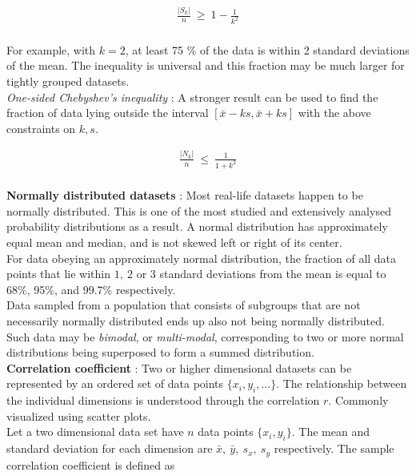 \begin{align}
	\frac{|S_{k}|}{n} \ \geq \ 1 - \frac{1}{k^{2}} 
\end{align}\\

For example, with $k = 2$, at least 75 \% of the data is within 2 standard deviations of the mean. The inequality is universal and this fraction may be much larger for tightly grouped datasets.\\

\textit{One-sided Chebyshev's inequality} : A stronger result can be used to find the fraction of data lying outside the interval  $ [ \bar{x} - ks, \bar{x} + ks ] $ with the above constraints on $ k, s $.

\begin{align}
	\frac{|N_{k}|}{n} \ \leq \ \frac{1}{1 + k^{2}} 
\end{align}\\

\textbf{Normally distributed datasets} : Most real-life datasets happen to be normally distributed. This is one of the most studied and extensively analysed probability distributions as a result. A normal distribution has approximately equal mean and median, and is not skewed left or right of its center.\\

For data obeying an approximately normal distribution, the fraction of all data points that lie within $ 1,\ 2 $ or $ 3 $ standard deviations from the mean is equal to 68\%, 95\%, and 99.7\% respectively. \\

Data sampled from a population that consists of subgroups that are not necessarily normally distributed ends up also not being normally distributed. Such data may be \textit{bimodal}, or \textit{multi-modal}, corresponding to two or more normal distributions being superposed to form a summed distribution. \\

\textbf{Correlation coefficient} : Two or higher dimensional datasets can be represented by an ordered set of data points $ \{x_i, y_i, ...\} $. The relationship between the individual dimensions is understood through the correlation $ r $. Commonly visualized using scatter plots. \\

Let a two dimensional data set have $ n $ data points $ \{x_i, y_i\} $. The mean and standard deviation for each dimension are $ \bar{x},\ \bar{y},\ s_x,\ s_y $ respectively. The sample correlation coefficient is defined as 

